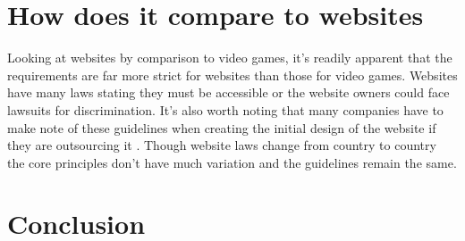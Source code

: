\documentclass{scrartcl}
\begin{document}
\section{How does it compare to websites}

Looking at websites by comparison to video games, it's readily apparent that the requirements are far more strict for websites than those for video games. Websites have many laws stating they must be accessible or the website owners could face lawsuits for discrimination. \cite{caldwell2008web} It's also worth noting that many companies have to make note of these guidelines when creating the initial design of the website if they are outsourcing it \cite{lawson2005web}. Though website laws change from country to country the core principles don't have much variation and the guidelines remain the same.



\section{Conclusion}




\end{document}
